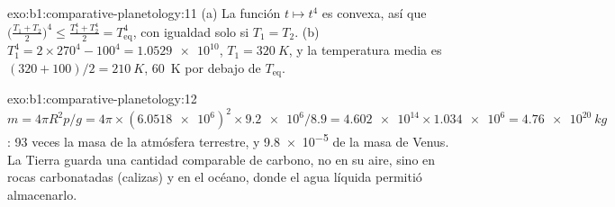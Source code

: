 \begin{solution}{exo:b1:comparative-planetology:11}
(a) La función $t\mapsto t^4$ es convexa, así que
$\bigl(\tfrac{T_1 + T_2}{2}\bigr)^4 \le \tfrac{T_1^4 + T_2^4}{2} =
T_\mathrm{eq}^4$, con igualdad solo si $T_1 = T_2$. (b) $T_1^4 =
2\times270^4 - 100^4 = \num{1.0529e10}$, $T_1 = \qty{320}{K}$, y la temperatura media es
$(320 + 100)/2 = \qty{210}{K}$, \qty{60}{K} por debajo de $T_\mathrm{eq}$.
\end{solution}

\begin{solution}{exo:b1:comparative-planetology:12}
$m = 4\pi R^2p/g = 4\pi\times(\num{6.0518e6})^2\times\num{9.2e6}/8.9 =
\num{4.602e14}\times\num{1.034e6} = \qty{4.76e20}{kg}$: 93 veces la masa de la atmósfera
terrestre, y \num{9.8e-5} de la masa de Venus. La Tierra guarda una cantidad comparable de
carbono, no en su aire, sino en rocas carbonatadas (calizas) y en el océano, donde el agua
líquida permitió almacenarlo.
\end{solution}

